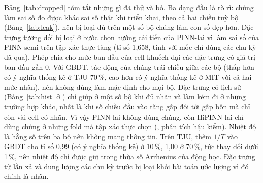 Bảng~\ref{tab:dropped} tóm tắt những gì đã thử và bỏ. Ba dạng đầu là rò rỉ: chúng làm sai số đo được khác sai số thật khi triển khai, theo cả hai chiều tuỳ bộ (Bảng~\ref{tab:leak}), nên bị loại dù trên một số bộ chúng làm con số đẹp hơn. Đặc trưng tương đối bị loại ở bước chọn hướng cải tiến của PINN-lai vì làm sai số của PINN-semi trên tập xác thực tăng (tỉ số 1{,}658, tính với mốc chỉ dùng các chu kỳ đã qua). Phép chia cho mức ban đầu của cell khuếch đại các đặc trưng có giá trị ban đầu gần 0. Với GBDT, tác động của chúng trái chiều giữa các bộ (thấp hơn có ý nghĩa thống kê ở TJU 70\,\%, cao hơn có ý nghĩa thống kê ở MIT với cả hai mức nhãn), nên không dùng làm mặc định cho mọi bộ. Đặc trưng có lịch sử (Bảng~\ref{tab:hist} ở ) chỉ giúp ở một số bộ khi đủ nhãn và làm kém đi ở những trường hợp khác, nhất là khi số chiều đầu vào tăng gấp đôi tới gấp bốn mà chỉ còn vài cell có nhãn. Vì vậy PINN-lai không dùng chúng, còn HiPINN-lai chỉ dùng chúng ở những fold mà tập xác thực chọn (, phân tích hậu kiểm). Nhiệt độ là hằng số trên ba bộ nên không mang thông tin. Trên TJU, thêm $1/T$ vào GBDT cho tỉ số 0{,}99 (có ý nghĩa thống kê) ở 10\,\%, 1{,}00 ở 70\,\%, tức thay đổi dưới 1\,\%, nên nhiệt độ chỉ được giữ trong thừa số Arrhenius của động học. Đặc trưng từ lần xả và dung lượng các chu kỳ trước bị loại khỏi bài toán ước lượng vì đó chính là nhãn.

